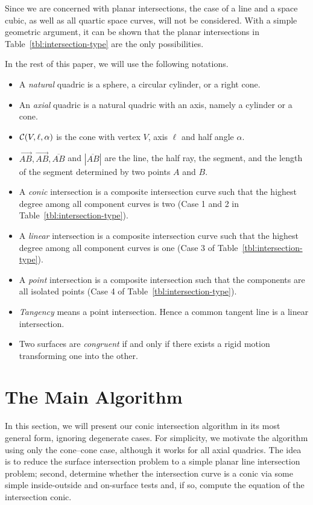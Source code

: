     Since we are concerned with planar intersections, the case of a line and 
a space cubic, as well as all quartic space curves, will not be considered.  
With a simple geometric argument, it can be shown that the planar intersections
in Table~\ref{tbl:intersection-type} are the only possibilities.

     In the rest of this paper, we will use the following notations.
\begin{itemize}
     \item A {\em natural} quadric is a sphere, a circular cylinder, or a 
          right cone.
     \item An {\em axial} quadric is a natural quadric with an axis, namely 
          a cylinder or a cone.
     \item ${\cal C}(V,\ell,\alpha)$ is the cone with vertex $V$, axis $\ell$
          and half angle $\alpha$.
     \item $\stackrel{\longleftrightarrow}{AB},
          \stackrel{\longrightarrow}{AB},\overline{AB}$ and
          $|\overline{AB}|$ are the line, the half ray, the segment, and the 
          length of the segment determined by two points $A$ and $B$.
     \item A {\em conic} intersection is a composite intersection curve such
          that the highest degree among all component curves is two (Case 1 
          and 2 in Table~\ref{tbl:intersection-type}).
     \item A {\em linear} intersection is a composite intersection curve such
          that the highest degree among all component curves is one (Case 3 
          of Table~\ref{tbl:intersection-type}).
     \item A {\em point} intersection is a composite intersection such that the
          components are all isolated points (Case 4 of 
          Table~\ref{tbl:intersection-type}).
     \item {\em Tangency} means a point intersection.  Hence a common tangent
          line is a linear intersection.
     \item Two surfaces are {\em congruent} if and only if there exists a 
          rigid motion transforming one into the other.
\end{itemize}



\section{The Main Algorithm}
\label{section:algorithm}
     In this section, we will present our conic intersection algorithm in its 
most general form, ignoring degenerate cases.  For simplicity, we motivate the
algorithm using only the cone--cone case, although it works for all axial 
quadrics.  The idea is to  reduce the surface intersection problem to a simple 
planar line intersection problem; second, determine whether the intersection 
curve is a conic via some simple inside-outside and on-surface tests and, if 
so, compute the equation of the intersection conic.

